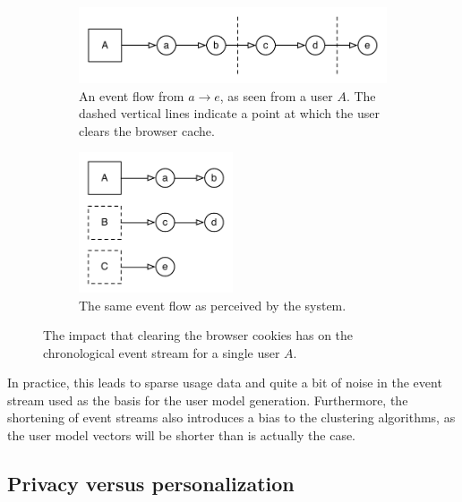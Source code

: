       \begin{figure}[h]
        \centering
          \begin{subfigure}[t]{0.8\textwidth}
            \includegraphics[width=\textwidth]{Figures/event-flow-cache-break-1}
            \caption{An event flow from $a \rightarrow e$, as seen from a user $A$. The dashed vertical lines indicate a point at which the user clears the browser cache.}
            \label{fig:cache_break1}
          \end{subfigure}
          \begin{subfigure}[t]{0.8\textwidth}
            \includegraphics[width=0.5\textwidth]{Figures/event-flow-cache-break-2}
            \caption{The same event flow as perceived by the system.}
            \label{fig:cache_break2}
          \end{subfigure}

          \caption{The impact that clearing the browser cookies has on the chronological event stream for a single user $A$.}
          \label{fig:clear_cookie_impact}
      \end{figure}

      In practice, this leads to sparse usage data and quite a bit of noise in the event stream used as the basis for the user model generation. Furthermore, the shortening of event streams also introduces a bias to the clustering algorithms, as the user model vectors will be shorter than is actually the case.

  \subsection{Privacy versus personalization}
  \label{survey:privacy_vs_personalization}


